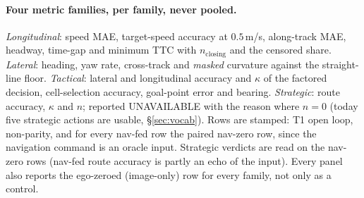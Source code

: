 \paragraph{Four metric families, per family, never pooled.}
\emph{Longitudinal}: speed MAE, target-speed accuracy at $0.5$\,m/s, along-track MAE, headway, time-gap and minimum TTC with $n_{\text{closing}}$ and the censored share. \emph{Lateral}: heading, yaw rate, cross-track and \emph{masked} curvature against the straight-line floor. \emph{Tactical}: lateral and longitudinal accuracy and $\kappa$ of the factored decision, cell-selection accuracy, goal-point error and bearing. \emph{Strategic}: route accuracy, $\kappa$ and $n$; reported UNAVAILABLE with the reason where $n=0$ (today five strategic actions are usable, \S\ref{sec:vocab}).
Rows are stamped: T1 open loop, non-parity, and for every nav-fed row the paired nav-zero row, since the navigation command is an oracle input. Strategic verdicts are read on the nav-zero rows (nav-fed route accuracy is partly an echo of the input). Every panel also reports the ego-zeroed (image-only) row for every family, not only as a control.

